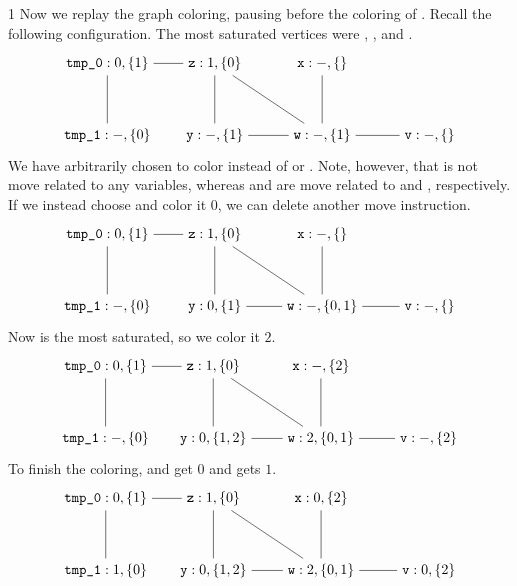 \documentclass[7x10]{TimesAPriori_MIT}%
\def\pythonEd{1}
\def\edition{1}
\newcommand{\pythonColor}[0]{}
\numberwithin{theorem}{chapter}
\numberwithin{definition}{chapter}
\numberwithin{equation}{chapter}
\begin{document}
{\if\edition\pythonEd\pythonColor
Now we replay the graph coloring, pausing before the coloring of
. Recall the following configuration. The most saturated vertices
were , , and .
\[
\begin{tikzpicture}[baseline=(current  bounding  box.center),scale=0.9]
\node (t0) at (0,2) {$\ttm{tmp\_0}: 0, \{1\}$};
\node (t1) at (0,0) {$\ttm{tmp\_1}: -, \{0\}$};
\node (z) at (3,2)  {$\ttm{z}: 1, \{0\}$};
\node (x) at (6,2)  {$\ttm{x}: -, \{\}$};
\node (y) at (3,0)  {$\ttm{y}: -, \{1\}$};
\node (w) at (6,0)  {$\ttm{w}: -, \{1\}$};
\node (v) at (9,0)  {$\ttm{v}: -, \{\}$};

\draw (t0) to (t1);
\draw (t0) to (z);
\draw (z) to (y);
\draw (z) to (w);
\draw (x) to (w);
\draw (y) to (w);
\draw (v) to (w);
\end{tikzpicture}
\]
We have arbitrarily chosen to color  instead of 
or . Note, however, that  is not move related to any
variables, whereas  and  are move related to
 and , respectively. If we instead choose
 and color it $0$, we can delete another move instruction.
\[
\begin{tikzpicture}[baseline=(current  bounding  box.center),scale=0.9]
\node (t0) at (0,2) {$\ttm{tmp\_0}: 0, \{1\}$};
\node (t1) at (0,0) {$\ttm{tmp\_1}: -, \{0\}$};
\node (z) at (3,2)  {$\ttm{z}: 1, \{0\}$};
\node (x) at (6,2)  {$\ttm{x}: -, \{\}$};
\node (y) at (3,0)  {$\ttm{y}: 0, \{1\}$};
\node (w) at (6,0)  {$\ttm{w}: -, \{0,1\}$};
\node (v) at (9,0)  {$\ttm{v}: -, \{\}$};

\draw (t0) to (t1);
\draw (t0) to (z);
\draw (z) to (y);
\draw (z) to (w);
\draw (x) to (w);
\draw (y) to (w);
\draw (v) to (w);
\end{tikzpicture}
\]
Now  is the most saturated, so we color it $2$.
\[
\begin{tikzpicture}[baseline=(current  bounding  box.center),scale=0.9]
\node (t0) at (0,2) {$\ttm{tmp\_0}: 0, \{1\}$};
\node (t1) at (0,0) {$\ttm{tmp\_1}: -, \{0\}$};
\node (z) at (3,2)  {$\ttm{z}: 1, \{0\}$};
\node (x) at (6,2)  {$\ttm{x}: -, \{2\}$};
\node (y) at (3,0)  {$\ttm{y}: 0, \{1,2\}$};
\node (w) at (6,0)  {$\ttm{w}: 2, \{0,1\}$};
\node (v) at (9,0)  {$\ttm{v}: -, \{2\}$};

\draw (t0) to (t1);
\draw (t0) to (z);
\draw (z) to (y);
\draw (z) to (w);
\draw (x) to (w);
\draw (y) to (w);
\draw (v) to (w);
\end{tikzpicture}
\]
To finish the coloring,  and  get $0$ and
 gets $1$.
\[
\begin{tikzpicture}[baseline=(current  bounding  box.center),scale=0.9]
\node (t0) at (0,2) {$\ttm{tmp\_0}: 0, \{1\}$};
\node (t1) at (0,0) {$\ttm{tmp\_1}: 1, \{0\}$};
\node (z) at (3,2)  {$\ttm{z}: 1, \{0\}$};
\node (x) at (6,2)  {$\ttm{x}: 0, \{2\}$};
\node (y) at (3,0)  {$\ttm{y}: 0, \{1,2\}$};
\node (w) at (6,0)  {$\ttm{w}: 2, \{0,1\}$};
\node (v) at (9,0)  {$\ttm{v}: 0, \{2\}$};

\draw (t0) to (t1);
\draw (t0) to (z);
\draw (z) to (y);
\draw (z) to (w);
\draw (x) to (w);
\draw (y) to (w);
\draw (v) to (w);
\end{tikzpicture}
\]
\fi}
\end{document}
